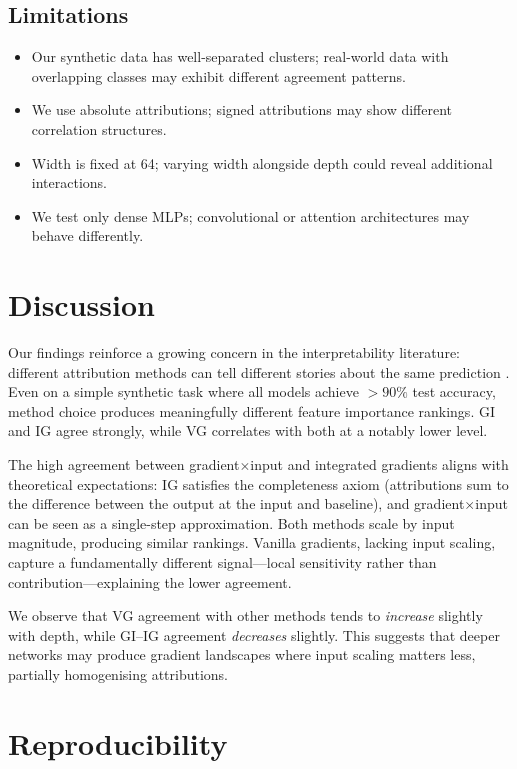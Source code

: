 \documentclass[11pt,a4paper]{article}
\begin{document}
\subsection{Limitations}
\begin{itemize}
    \item Our synthetic data has well-separated clusters; real-world data with overlapping classes may exhibit different agreement patterns.
    \item We use absolute attributions; signed attributions may show different correlation structures.
    \item Width is fixed at 64; varying width alongside depth could reveal additional interactions.
    \item We test only dense MLPs; convolutional or attention architectures may behave differently.
\end{itemize}

\section{Discussion}

Our findings reinforce a growing concern in the interpretability literature: different attribution methods can tell different stories about the same prediction \citep{krishna2022disagreement}. Even on a simple synthetic task where all models achieve $>90\%$ test accuracy, method choice produces meaningfully different feature importance rankings. GI and IG agree strongly, while VG correlates with both at a notably lower level.

The high agreement between gradient$\times$input and integrated gradients aligns with theoretical expectations: IG satisfies the completeness axiom (attributions sum to the difference between the output at the input and baseline), and gradient$\times$input can be seen as a single-step approximation. Both methods scale by input magnitude, producing similar rankings. Vanilla gradients, lacking input scaling, capture a fundamentally different signal---local sensitivity rather than contribution---explaining the lower agreement.

We observe that VG agreement with other methods tends to \emph{increase} slightly with depth, while GI--IG agreement \emph{decreases} slightly. This suggests that deeper networks may produce gradient landscapes where input scaling matters less, partially homogenising attributions.

\section{Reproducibility}
\end{document}
